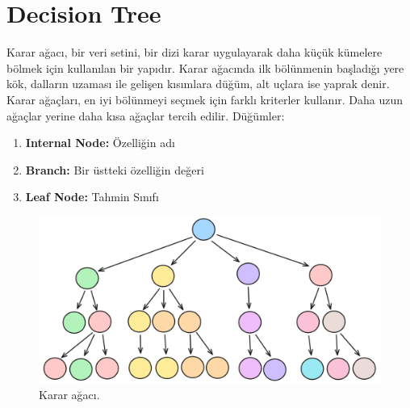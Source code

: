 \section{Decision Tree}
Karar ağacı, bir veri setini, bir dizi karar uygulayarak daha küçük kümelere bölmek için kullanılan bir yapıdır. Karar ağacında ilk bölünmenin başladığı yere kök, dalların uzaması ile gelişen kısımlara düğüm, alt uçlara ise yaprak denir. Karar ağaçları, en iyi bölünmeyi seçmek için farklı kriterler kullanır. Daha uzun ağaçlar yerine daha kısa ağaçlar tercih edilir.  Düğümler:
\begin{enumerate}
    \item \textbf{Internal Node:} Özelliğin adı
    \item \textbf{Branch:} Bir üstteki özelliğin değeri
    \item \textbf{Leaf Node:} Tahmin Sınıfı
\end{enumerate}

\begin{figure}[h]
    \centering
    \includegraphics[width=1\textwidth]{images/decision_tree_structure.png}
    \caption{Karar ağacı.}
    \label{fig:enter-label}
\end{figure}

